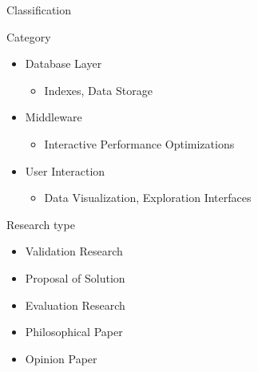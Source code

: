 \documentclass[10pt]{beamer}
\begin{document}
\begin{frame}{Classification}
        \begin{block}{Category~\cite{Idreos2015}}
            \begin{itemize}
                \item Database Layer
                    \begin{itemize}
                        \item Indexes, Data Storage
                    \end{itemize}
                \item Middleware
                    \begin{itemize}
                        \item Interactive Performance Optimizations
                    \end{itemize}
                \item User Interaction
                    \begin{itemize}
                        \item Data Visualization, Exploration Interfaces
                    \end{itemize}
            \end{itemize}
        \end{block}
        \begin{block}{Research type~\cite{Wieringa2006}}
            \begin{itemize}
                \item Validation Research
                \item Proposal of Solution
                \item Evaluation Research
                \item Philosophical Paper
                \item Opinion Paper
            \end{itemize}
        \end{block}
\end{frame}
\end{document}
